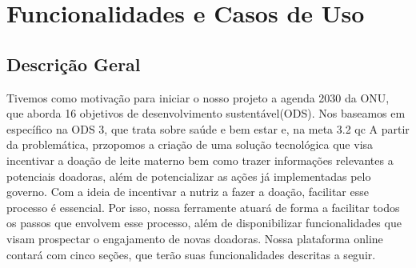 \chapter{Funcionalidades e Casos de Uso}
\section{Descrição Geral}
\label{sec:descricao}
Tivemos como motivação para iniciar o nosso projeto a agenda 2030 da ONU, que aborda 16 objetivos de desenvolvimento sustentável(ODS). Nos baseamos em específico na ODS 3, que trata sobre saúde e bem estar e, na meta 3.2 qc
A partir da problemática, przopomos a criação de uma solução tecnológica que visa incentivar a doação de leite materno bem como trazer informações relevantes a potenciais doadoras, além de potencializar as ações já implementadas pelo governo.
Com a ideia de incentivar a nutriz a fazer a doação, facilitar esse processo é essencial. Por isso, nossa ferramente atuará de forma a facilitar todos os passos que envolvem esse processo, além de disponibilizar funcionalidades que visam prospectar o engajamento de novas doadoras. 
Nossa plataforma online contará com cinco seções, que terão suas funcionalidades descritas a seguir. 

